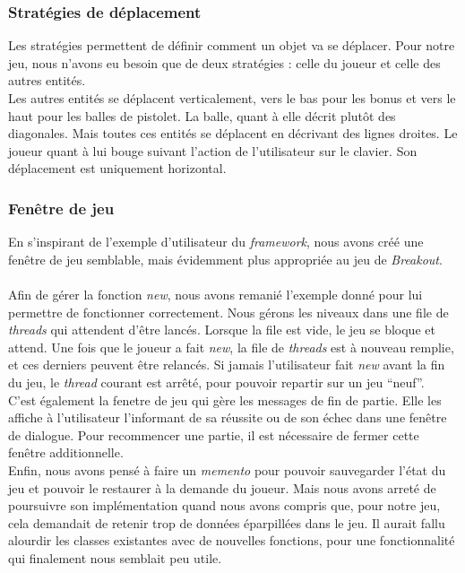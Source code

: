 \documentclass[a4paper,10pt]{article}
\begin{document}
    \subsubsection{Stratégies de déplacement}
        Les stratégies permettent de définir comment un objet va se déplacer. Pour notre jeu, nous n'avons eu besoin
        que de deux stratégies  : celle du joueur et celle des autres entités. \\ Les autres entités
        se déplacent verticalement, vers le bas pour les bonus et vers le haut pour les balles de pistolet. La balle, quant
        à elle décrit plutôt des diagonales. Mais toutes ces entités se déplacent en décrivant des lignes droites.
        Le joueur quant à lui bouge suivant l'action de l'utilisateur sur le clavier. Son déplacement est uniquement horizontal.

    \subsubsection{Fenêtre de jeu}
        En s'inspirant de l'exemple d'utilisateur du \textit{framework}, nous avons créé une fenêtre de jeu semblable,
        mais évidemment plus appropriée au jeu de \textit{Breakout}. \\ \\


        Afin de gérer la fonction \textit{new}, nous avons remanié l'exemple donné pour lui permettre de fonctionner
        correctement. Nous gérons les niveaux dans une file de \textit{threads} qui attendent d'être lancés. Lorsque la file
        est vide, le jeu se bloque et attend. Une fois que le joueur a fait \textit{new}, la file de \textit{threads} est
        à nouveau remplie, et ces derniers peuvent être relancés. Si jamais l'utilisateur fait \textit{new} avant
        la fin du jeu, le \textit{thread} courant est arrêté, pour pouvoir repartir sur un jeu ``neuf''. \\

        C'est également la fenetre de jeu qui gère les messages de fin de partie. Elle les affiche à l'utilisateur
        l'informant de sa réussite ou de son échec dans une fenêtre de dialogue. Pour recommencer une partie, il
        est nécessaire de fermer cette fenêtre additionnelle. \\

        Enfin, nous avons pensé à faire un \textit{memento} pour pouvoir sauvegarder l'état du jeu et pouvoir le
        restaurer à la demande du joueur. Mais nous avons arreté de poursuivre son implémentation quand nous avons
        compris que, pour notre jeu, cela demandait de retenir trop de données éparpillées dans le jeu. Il aurait
        fallu alourdir les classes existantes avec de nouvelles fonctions, pour une fonctionnalité qui finalement
        nous semblait peu utile.
\end{document}
